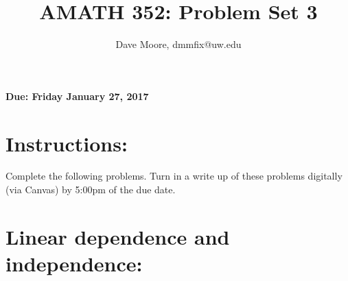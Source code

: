 \documentclass[]{article}
\title{AMATH 352: Problem Set 3}
\author{Dave Moore, dmmfix@uw.edu}
\begin{document}
\maketitle
    {\Large \textbf{Due: Friday January 27, 2017}}


    \section*{Instructions:} Complete the following problems. Turn in a write up of these problems digitally (via Canvas) by 5:00pm of the due date.

    \hrulefill

    \vskip 1cm

    \section*{Linear dependence and independence:}
\end{document}

